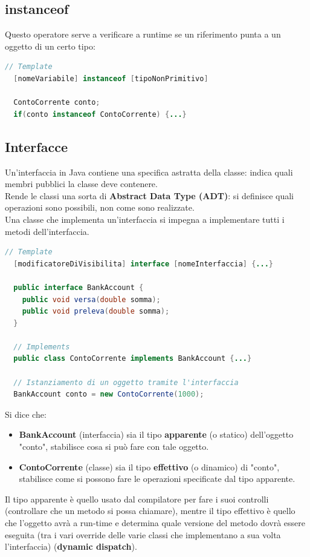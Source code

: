 \documentclass[12pt,a4paper]{article}
\begin{document}
\subsection{instanceof}
Questo operatore serve a verificare a runtime se un riferimento punta a un oggetto di un certo tipo:
\begin{lstlisting}[language=Java]
  // Template
  [nomeVariabile] instanceof [tipoNonPrimitivo]

  ContoCorrente conto;
  if(conto instanceof ContoCorrente) {...}
\end{lstlisting}
\subsection{Interfacce}
Un'interfaccia in Java contiene una specifica astratta della classe: indica quali membri pubblici la classe deve contenere.\\
Rende le classi una sorta di \textbf{Abstract Data Type (ADT)}: si definisce quali operazioni sono possibili, non come sono realizzate.\\
Una classe che implementa un'interfaccia si impegna a implementare tutti i metodi dell'interfaccia.
\begin{lstlisting}[language=Java]
  // Template
  [modificatoreDiVisibilita] interface [nomeInterfaccia] {...}

  public interface BankAccount {
    public void versa(double somma);
    public void preleva(double somma);
  }

  // Implements
  public class ContoCorrente implements BankAccount {...}

  // Istanziamento di un oggetto tramite l'interfaccia
  BankAccount conto = new ContoCorrente(1000);
\end{lstlisting}
Si dice che:
\begin{itemize}
  \item \textbf{BankAccount} (interfaccia) sia il tipo \textbf{apparente} (o statico) dell'oggetto "conto", stabilisce cosa si può fare con tale oggetto.
  \item \textbf{ContoCorrente} (classe) sia il tipo \textbf{effettivo} (o dinamico) di "conto", stabilisce come si possono fare le operazioni specificate dal tipo apparente.
\end{itemize}
Il tipo apparente è quello usato dal compilatore per fare i suoi controlli (controllare che un metodo si possa chiamare), mentre il tipo effettivo è quello che l'oggetto avrà a run-time e determina quale versione del metodo dovrà essere eseguita (tra i vari override delle varie classi che implementano a sua volta l'interfaccia) (\textbf{dynamic dispatch}).\\
\end{document}

